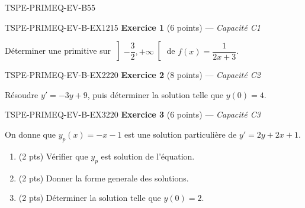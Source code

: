 

\begin{evaluation}{TSPE-PRIMEQ-EV-B}{55}

\begin{exercice}{TSPE-PRIMEQ-EV-B-EX1}{2}{15}
\textbf{Exercice 1} (6 points) — \textit{Capacité C1}

\medskip

Déterminer une primitive sur $\left]-\dfrac{3}{2},+\infty\right[$ de $f(x) = \dfrac{1}{2x+3}$.
\end{exercice}

\begin{exercice}{TSPE-PRIMEQ-EV-B-EX2}{2}{20}
\textbf{Exercice 2} (8 points) — \textit{Capacité C2}

\medskip

Résoudre $y' = -3y + 9$, puis déterminer la solution telle que $y(0) = 4$.
\end{exercice}

\begin{exercice}{TSPE-PRIMEQ-EV-B-EX3}{2}{20}
\textbf{Exercice 3} (6 points) — \textit{Capacité C3}

\medskip

On donne que $y_p(x) = -x-1$ est une solution particulière de $y' = 2y+2x+1$.
\begin{enumerate}
  \item (2 pts) Vérifier que $y_p$ est solution de l'équation.
  \item (2 pts) Donner la forme generale des solutions.
  \item (2 pts) Déterminer la solution telle que $y(0) = 2$.
\end{enumerate}
\end{exercice}

\end{evaluation}
